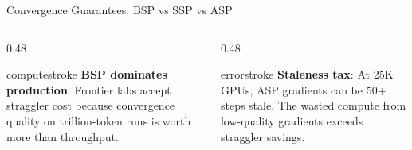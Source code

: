 \documentclass[aspectratio=169, 12pt]{beamer}
\begin{document}
\begin{frame}{Convergence Guarantees: BSP vs SSP vs ASP}
\vspace{0.15cm}
\begin{columns}[T]
  \begin{column}{0.48\textwidth}
    \begin{mlsyscard}{computestroke}
    {\scriptsize \textbf{BSP dominates production}: Frontier labs accept straggler cost because convergence quality on trillion-token runs is worth more than throughput.}
    \end{mlsyscard}
  \end{column}
  \begin{column}{0.48\textwidth}
    \begin{mlsyscard}{errorstroke}
    {\scriptsize \textbf{Staleness tax}: At 25K GPUs, ASP gradients can be 50+ steps stale. The wasted compute from low-quality gradients exceeds straggler savings.}
    \end{mlsyscard}
  \end{column}
\end{columns}

\end{frame}
\end{document}

